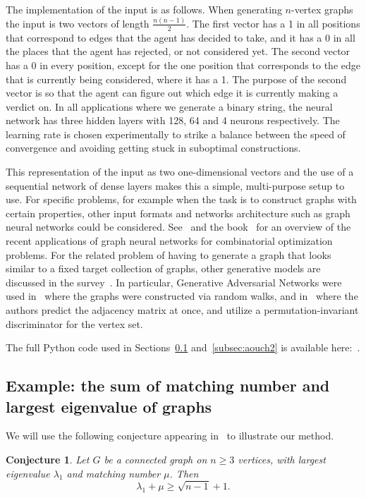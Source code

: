 \documentclass[11pt,english]{article}
\theoremstyle{plain}
\newtheorem{conjecture}[theorem]{Conjecture}
\theoremstyle{remark}
\begin{document}
The implementation of the input is as follows. When generating $n$-vertex graphs the input is two vectors of length $\frac{n(n-1)}{2}$. The first vector has a 1 in all positions that correspond to edges that the agent has decided to take, and it has a 0 in all the places that the agent has rejected, or not considered yet. The second vector has a 0 in every position, except for the one position that corresponds to the edge that is currently being considered, where it has a 1. The purpose of the second vector is so that the agent can figure out which edge it is currently making a verdict on. In all applications where we generate a binary string, the neural network has three hidden layers with 128, 64 and 4 neurons respectively. The learning rate is chosen experimentally to strike a balance between the speed of convergence and avoiding getting stuck in suboptimal constructions.

This representation of the input as two one-dimensional vectors and the use of a sequential network of dense layers makes this a simple, multi-purpose setup to use. For specific problems, for example when the task is to construct graphs with certain properties, other input formats and networks architecture such as graph neural networks could be considered. See~\cite{deepmind} and the book~\cite{gnnbook} for an overview of the recent applications of graph neural networks for combinatorial optimization problems.
For the related problem of having to generate a graph that looks similar to a fixed target collection of graphs, other generative models are discussed in the survey~\cite{graphgensurvey}. In particular, Generative Adversarial Networks were used in~\cite{gan1} where the graphs were constructed via random walks, and in~\cite{gan2} where the authors predict the adjacency matrix at once, and utilize a permutation-invariant discriminator for the vertex set.

The full Python code used in Sections~\ref{subsec:matchingeigen} and~\ref{subsec:aouch2} is available here:~\cite{code}.


\subsection{Example: the sum of matching number and largest eigenvalue of graphs}\label{subsec:matchingeigen}

We will use the following conjecture appearing in~\cite{aouch} to illustrate our method. 

\begin{conjecture}
Let $G$ be a connected graph on $n\geq 3$ vertices, with largest eigenvalue $\lambda_1$ and matching number $\mu$. Then
$$\lambda_1+\mu \geq \sqrt{n-1} +1.$$ \label{conj:aouch}
\end{conjecture}
\end{document}

